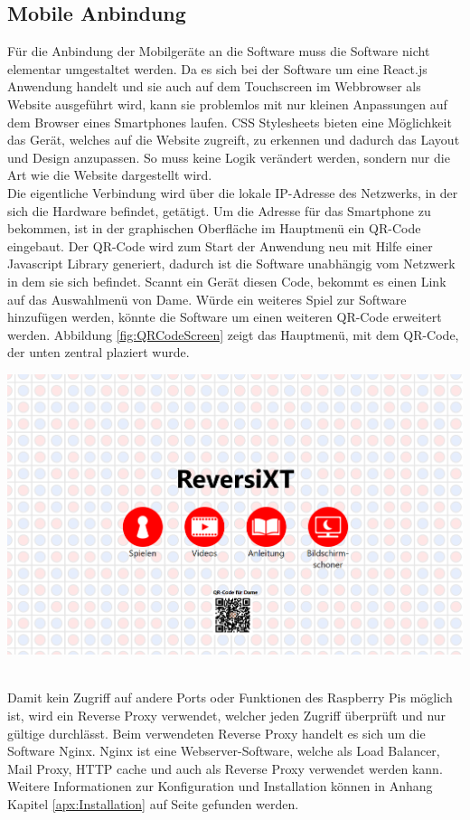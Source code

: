 \documentclass[12pt,a4paper,bibliography=totocnumbered,listof=totocnumbered]{article}
\begin{document}
\subsection{Mobile Anbindung}
Für die Anbindung der Mobilgeräte an die Software muss die Software nicht elementar umgestaltet werden. 
Da es sich bei der Software um eine React.js Anwendung handelt und sie auch auf dem Touchscreen im Webbrowser als Website 
ausgeführt wird, kann sie problemlos mit nur kleinen Anpassungen auf dem Browser eines Smartphones laufen.
CSS Stylesheets bieten eine Möglichkeit das Gerät, welches auf die Website zugreift, zu erkennen und 
dadurch das Layout und Design anzupassen. So muss keine Logik verändert werden, sondern nur die Art wie die Website dargestellt wird.
\\
Die eigentliche Verbindung wird über die lokale IP-Adresse des Netzwerks, in der sich 
die Hardware befindet, getätigt. Um die Adresse für das Smartphone zu bekommen, ist in der graphischen Oberfläche im 
Hauptmenü ein QR-Code eingebaut. Der QR-Code wird zum Start der Anwendung neu mit Hilfe einer Javascript Library generiert,
dadurch ist die Software unabhängig vom Netzwerk in dem sie sich befindet. Scannt ein Gerät diesen Code, bekommt es einen Link auf das Auswahlmenü von Dame. Würde ein weiteres
Spiel zur Software hinzufügen werden, könnte die Software um einen weiteren QR-Code erweitert werden. 
Abbildung \ref{fig:QRCodeScreen} zeigt das Hauptmenü, mit dem QR-Code, der unten zentral plaziert wurde.

\vspace{1em}
\begin{minipage}{\linewidth}
	\centering
	\includegraphics[width=0.7\linewidth]{pics/mainMenuWithQR.png}
	\label{fig:QRCodeScreen}
\end{minipage}
\\

Damit kein Zugriff auf andere Ports oder Funktionen des Raspberry Pis möglich ist,
wird ein Reverse Proxy verwendet, welcher jeden Zugriff überprüft und nur gültige durchlässt. Beim verwendeten Reverse Proxy handelt 
es sich um die Software Nginx. Nginx ist eine Webserver-Software, welche als Load Balancer, Mail Proxy, HTTP cache und auch 
als Reverse Proxy verwendet werden kann. Weitere Informationen zur Konfiguration und Installation können in Anhang Kapitel \ref{apx:Installation} 
auf Seite \pageref{apx:Installation} gefunden werden.
\end{document}
